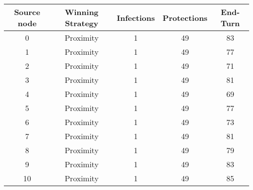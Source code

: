 \documentclass[results.tex]{subfiles}
\begin{document}
    \begin{center}
        \begin{tabular}{| c || c | c | c | c |}
            \hline
            {\bfseries Source node} & {\bfseries Winning Strategy} & {\bfseries Infections} & {\bfseries Protections}
            & {\bfseries End-Turn}
            \\  %
            \hline\hline
            0                       & Proximity                    & 1                      & 49                      & 83                   \\
            \hline
            1                       & Proximity                    & 1                      & 49                      & 77                   \\
            \hline
            2                       & Proximity                    & 1                      & 49                      & 71                   \\
            \hline
            3                       & Proximity                    & 1                      & 49                      & 81                   \\
            \hline
            4                       & Proximity                    & 1                      & 49                      & 69                   \\
            \hline
            5                       & Proximity                    & 1                      & 49                      & 77                   \\
            \hline
            6                       & Proximity                    & 1                      & 49                      & 73                   \\
            \hline
            7                       & Proximity                    & 1                      & 49                      & 81                   \\
            \hline
            8                       & Proximity                    & 1                      & 49                      & 79                   \\
            \hline
            9                       & Proximity                    & 1                      & 49                      & 83                   \\
            \hline
            10                      & Proximity                    & 1                      & 49                      & 85                   \\

\end{tabular}
\end{center}
\end{document}
